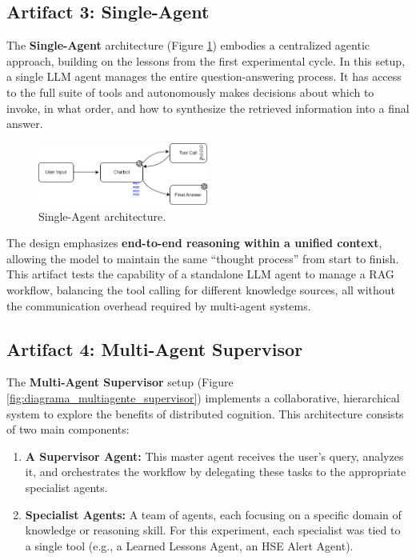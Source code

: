     \subsection{Artifact 3: Single-Agent}

        The \textbf{Single-Agent} architecture (Figure \ref{fig:diagrama_single_agent}) embodies a centralized agentic approach, building on the lessons from the first experimental cycle. In this setup, a single LLM agent manages the entire question-answering process. It has access to the full suite of tools and autonomously makes decisions about which to invoke, in what order, and how to synthesize the retrieved information into a final answer.
        
        \begin{figure}[h]
            \centering
            \includegraphics[width=0.5\textwidth]{images_exp2/diagrams/diagrama_single_agent.png}
            \caption{Single-Agent architecture.}
            \label{fig:diagrama_single_agent}
        \end{figure}    

        The design emphasizes \textbf{end-to-end reasoning within a unified context}, allowing the model to maintain the same ``thought process'' from start to finish. This artifact tests the capability of a standalone LLM agent to manage a RAG workflow, balancing the tool calling for different knowledge sources, all without the communication overhead required by multi-agent systems.
        

    \subsection{Artifact 4: Multi-Agent Supervisor}
    
        The \textbf{Multi-Agent Supervisor} setup (Figure \ref{fig:diagrama_multiagente_supervisor}) implements a collaborative, hierarchical system to explore the benefits of distributed cognition. This architecture consists of two main components:        

        \begin{enumerate}
            \item \textbf{A Supervisor Agent:} This master agent receives the user's query, analyzes it, and orchestrates the workflow by delegating these tasks to the appropriate specialist agents.
            \item \textbf{Specialist Agents:} A team of agents, each focusing on a specific domain of knowledge or reasoning skill. For this experiment, each specialist was tied to a single tool (e.g., a Learned Lessons Agent, an HSE Alert Agent).
        \end{enumerate}
        

